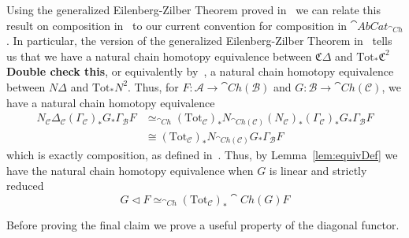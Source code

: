 Using the generalized Eilenberg-Zilber Theorem proved in~\cite[Chap. 7, Thm 4.1]{barr2002acyclic} we can relate this result on composition in~\cite{BJORT} to our current convention for composition in $\cat{AbCat}_{\cat{Ch}}$. In particular, the version of the generalized Eilenberg-Zilber Theorem in~\cite[Chap. 7, Thm 4.1]{barr2002acyclic} tells us that we have a natural chain homotopy equivalence between $\mathfrak{C}\Delta$ and $\text{Tot}_*\mathfrak{C}^2$ \textbf{Double check this}, or equivalently by~\cite[Thm 2.5]{goerss-jardine}, a natural chain homotopy equivalence between $N\Delta$ and $\text{Tot}_*N^2$. Thus, for $F:\mathcal{A}\to \cat{Ch}(\mathcal{B})$ and $G:\mathcal{B}\to \cat{Ch}(\mathcal{C})$, we have a natural chain homotopy equivalence 
\begin{align*}
    N_\mathcal{C}\Delta_\mathcal{C}(\Gamma_\mathcal{C})_*G_*\Gamma_\mathcal{B}F &\simeq_{\cat{Ch}} (\text{Tot}_\mathcal{C})_*N_{\cat{Ch}(\mathcal{C})}(N_\mathcal{C})_*(\Gamma_\mathcal{C})_*G_*\Gamma_\mathcal{B}F \\
    &\cong (\text{Tot}_\mathcal{C})_*N_{\cat{Ch}(\mathcal{C})}G_*\Gamma_\mathcal{B}F 
\end{align*}
which is exactly composition, as defined in~\cite{BJORT}. Thus, by Lemma~\ref{lem:equivDef} we have the natural chain homotopy equivalence when $G$ is linear and strictly reduced
\begin{equation*}
    G\lhd F \simeq_{\cat{Ch}} (\text{Tot}_\mathcal{C})_*\cat{Ch}(G)F
\end{equation*}



Before proving the final claim we prove a useful property of the diagonal functor.

